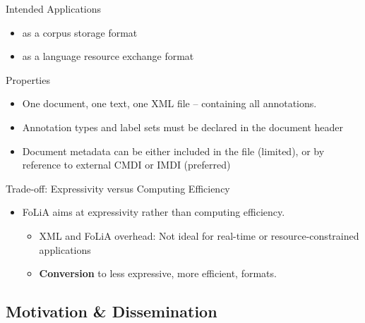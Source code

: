 \documentclass[compress,10pt]{beamer}
\begin{document}
\begin{frame}

	\begin{block}{Intended Applications}
		\begin{itemize}
			\item as a corpus storage format
			\item as a language resource exchange format 
		\end{itemize}				
	\end{block}

	\begin{block}{Properties}
		\begin{itemize}	
			\item One document, one text, one XML file -- containing all annotations.
			\item Annotation types and label sets must be declared in the document header
			\item Document metadata can be either included in the file (limited), or by reference to external CMDI or IMDI (preferred)
		\end{itemize}
	\end{block}
	
	\begin{block}{Trade-off: Expressivity versus Computing Efficiency}		
		\begin{itemize}
			\item FoLiA aims at expressivity rather than computing efficiency. 
			\begin{itemize}
				\item XML and FoLiA overhead: Not ideal for real-time or resource-constrained applications
				\item \textbf{Conversion} to less expressive, more efficient, formats.
			\end{itemize}			 
		\end{itemize}	
	\end{block}
	
\end{frame}	
	
\subsection{Motivation \& Dissemination}	
	
\end{document}
